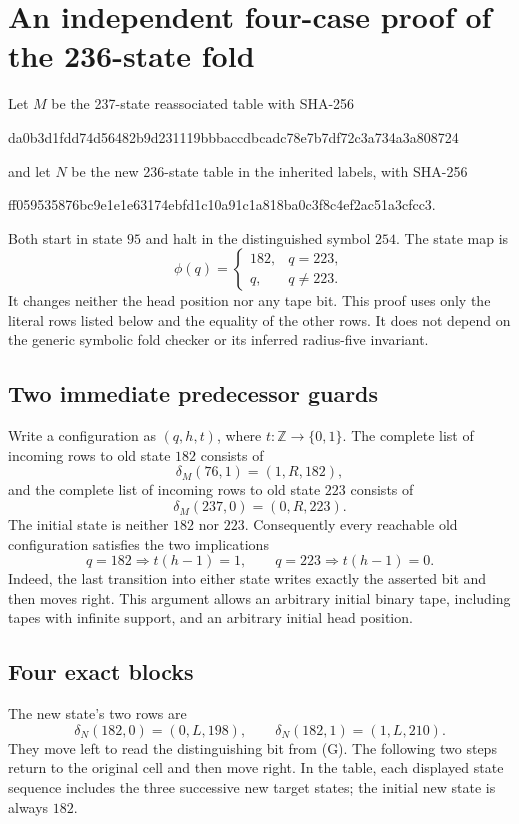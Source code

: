 \section{An independent four-case proof of the 236-state fold}
\label{sec:four-case-fold}

Let $M$ be the 237-state reassociated table with SHA-256
\begin{center}\small\ttfamily
da0b3d1fdd74d56482b9d231119bbbaccdbcadc78e7b7df72c3a734a3a808724
\end{center}
and let $N$ be the new 236-state table in the inherited labels, with SHA-256
\begin{center}\small\ttfamily
ff059535876bc9e1e1e63174ebfd1c10a91c1a818ba0c3f8c4ef2ac51a3cfcc3.
\end{center}
Both start in state $95$ and halt in the distinguished symbol $254$.
The state map is
\[
 \phi(q)=\begin{cases}182,&q=223,\\q,&q\ne223.\end{cases}
\]
It changes neither the head position nor any tape bit.  This proof uses only
the literal rows listed below and the equality of the other rows.  It does
not depend on the generic symbolic fold checker or its inferred radius-five
invariant.

\subsection*{Two immediate predecessor guards}

Write a configuration as $(q,h,t)$, where $t:\mathbb Z\to\{0,1\}$.
The complete list of incoming rows to old state $182$ consists of
\[
 \delta_M(76,1)=(1,R,182),
\]
and the complete list of incoming rows to old state $223$ consists of
\[
 \delta_M(237,0)=(0,R,223).
\]
The initial state is neither $182$ nor $223$.  Consequently every reachable
old configuration satisfies the two implications
\[
 q=182\Longrightarrow t(h-1)=1,
 \qquad
 q=223\Longrightarrow t(h-1)=0.
 \tag{G}
\]
Indeed, the last transition into either state writes exactly the asserted
bit and then moves right.  This argument allows an arbitrary initial binary
tape, including tapes with infinite support, and an arbitrary initial head
position.

\subsection*{Four exact blocks}

The new state's two rows are
\[
 \delta_N(182,0)=(0,L,198),\qquad
 \delta_N(182,1)=(1,L,210).
\]
They move left to read the distinguishing bit from (G).  The following two
steps return to the original cell and then move right.  In the table, each
displayed state sequence includes the three successive new target states;
the initial new state is always $182$.

